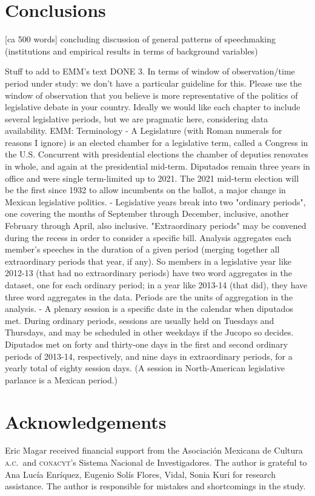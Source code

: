 \documentclass[letter,12pt]{article}
\begin{document}
\section{Conclusions} [ca 500 words]
concluding discussion of general patterns of speechmaking (institutions and empirical results in terms of background variables)


Stuff to add to EMM’s text
DONE 3. In terms of window of observation/time period under study: we don’t have a particular guideline for this. Please use the window of observation that you believe is more representative of the politics of legislative debate in your country. Ideally we would like each chapter to include several legislative periods, but we are pragmatic here, considering data availability.
EMM: Terminology
- A Legislature (with Roman numerals for reasons I ignore) is an elected chamber for a legislative term, called a Congress in the U.S. Concurrent with presidential elections the chamber of deputies renovates in whole, and again at the presidential mid-term. Diputados remain three years in office and were single term-limited up to 2021. The 2021 mid-term election will be the first since 1932 to allow incumbents on the ballot, a major change in Mexican legislative politics.
- Legislative years break into two "ordinary periods", one covering the months of September through December, inclusive, another February through April, also inclusive. "Extraordinary periods" may be convened during the recess in order to consider a specific bill. Analysis aggregates each member's speeches in the duration of a given period (merging together all extraordinary periods that year, if any). So members in a legislative year like 2012-13 (that had no extraordinary periods) have two word aggregates in the dataset, one for each ordinary period; in a year like 2013-14 (that did), they have three word aggregates in the data. Periods are the units of aggregation in the analysis. 
- A plenary session is a specific date in the calendar when diputados met. During ordinary periods, sessions are usually held on Tuesdays and Thursdays, and may be scheduled in other weekdays if the Jucopo so decides. Diputados met on forty and thirty-one days in the first and second ordinary periods of 2013-14, respectively, and nine days in extraordinary periods, for a yearly total of eighty session days. (A session in North-American legislative parlance is a Mexican period.)


\section*{Acknowledgements}
Eric Magar received financial support from the Asociaci\'on Mexicana de Cultura \textsc{a.c.}\ and \textsc{conacyt}'s Sistema Nacional de Investigadores. The author is grateful to Ana Lucía Enríquez, Eugenio Solís Flores, Vidal, Sonia Kuri for research assistance. The author is responsible for mistakes and shortcomings in the study.
\end{document}
